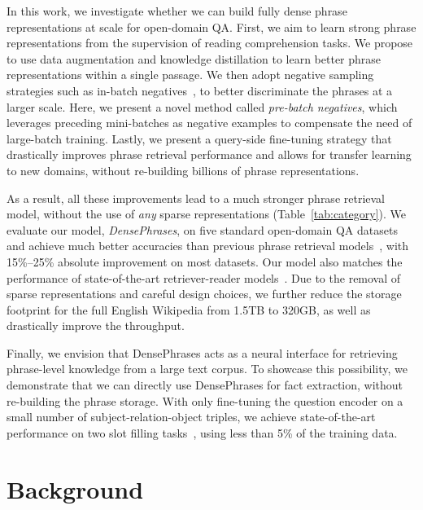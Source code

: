 \documentclass[11pt,a4paper]{article}
\newcommand\ti[1]{\textit{#1}}
\begin{document}
In this work, we investigate whether we can build fully dense phrase representations at scale for open-domain QA.
First, we aim to learn strong phrase representations from the supervision of reading comprehension tasks.
We propose to use data augmentation and knowledge distillation to learn better phrase representations within a single passage.
We then adopt negative sampling strategies such as in-batch negatives~\citep{henderson2017efficient,karpukhin2020dense}, to better discriminate the phrases at a larger scale.
Here, we present a novel method called \ti{pre-batch negatives}, which leverages preceding mini-batches as negative examples to compensate the need of large-batch training.
Lastly, we present a {query-side fine-tuning strategy} that drastically improves phrase retrieval performance and allows for transfer learning to new domains, without re-building billions of phrase representations.

As a result, all these improvements lead to a much stronger phrase retrieval model, without the use of \ti{any} sparse representations (Table~\ref{tab:category}). We evaluate our model, \ti{DensePhrases}, on five standard open-domain QA datasets and achieve much better accuracies than previous phrase retrieval models~\citep{seo2019real,lee2020contextualized}, with 15\%--25\% absolute improvement on most datasets.
Our model also matches the performance of state-of-the-art retriever-reader models~\citep{guu2020realm,karpukhin2020dense}.
Due to the removal of sparse representations and careful design choices, we further reduce the storage footprint for the full English Wikipedia from 1.5TB to 320GB, as well as drastically improve the throughput.


Finally, we envision that DensePhrases acts as a neural interface for retrieving phrase-level knowledge from a large text corpus.
To showcase this possibility, we demonstrate that we can directly use DensePhrases for fact extraction, without re-building the phrase storage.
With only fine-tuning the question encoder on a small number of subject-relation-object triples, we achieve state-of-the-art performance on two slot filling tasks~\citep{petroni2020kilt}, using less than 5\% of the training data.


 

\section{Background}
\label{sec:background}
\end{document}
